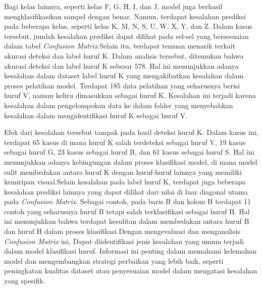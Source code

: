 Bagi kelas lainnya, seperti kelas F, G, H, I, dan J, model juga berhasil mengklasifikasikan sampel dengan benar. Namun, terdapat kesalahan prediksi pada beberapa kelas, seperti kelas K, M, N, S, U, W, X, Y, dan Z. Dalam kasus tersebut, jumlah kesalahan prediksi dapat dilihat pada sel-sel yang bersesuaian dalam tabel \textit{Confusion Matrix}.Selain itu, terdapat temuan menarik terkait akurasi deteksi dan label huruf K. Dalam analisis tersebut, ditemukan bahwa akurasi deteksi dan label huruf K sebesar 578. Hal ini menunjukkan adanya kesalahan dalam dataset label huruf K yang mengakibatkan kesalahan dalam proses pelatihan model. Terdapat 185 data pelatihan yang seharusnya berisi huruf V, namun keliru dimasukkan sebagai huruf K. Kesalahan ini terjadi karena kesalahan dalam pengelompokan data ke dalam folder yang menyebabkan kesalahan dalam mengidentifikasi huruf K sebagai huruf V.

Efek dari kesalahan tersebut tampak pada hasil deteksi huruf K. Dalam kasus ini, terdapat 65 kasus di mana huruf K salah terdeteksi sebagai huruf V, 19 kasus sebagai huruf G, 23 kasus sebagai huruf B, dan 61 kasus sebagai huruf S. Hal ini menunjukkan adanya kebingungan dalam proses klasifikasi model, di mana model sulit membedakan antara huruf K dengan huruf-huruf lainnya yang memiliki kemiripan visual.Selain kesalahan pada label huruf K, terdapat juga beberapa kesalahan prediksi lainnya yang dapat dilihat dari nilai di luar diagonal utama pada \textit{Confusion Matrix}. Sebagai contoh, pada baris B dan kolom H terdapat 11 contoh yang seharusnya huruf B tetapi salah terklasifikasi sebagai huruf H. Hal ini menunjukkan bahwa terdapat kesulitan dalam membedakan antara huruf B dan huruf H dalam proses klasifikasi.Dengan mengevaluasi dan menganalisis \textit{Confusion Matrix} ini, Dapat diidentifikasi jenis kesalahan yang umum terjadi dalam model klasifikasi huruf. Informasi ini penting dalam memahami kelemahan model dan mengembangkan strategi perbaikan yang lebih baik, seperti peningkatan kualitas dataset atau penyesuaian model dalam mengatasi kesalahan yang spesifik.


